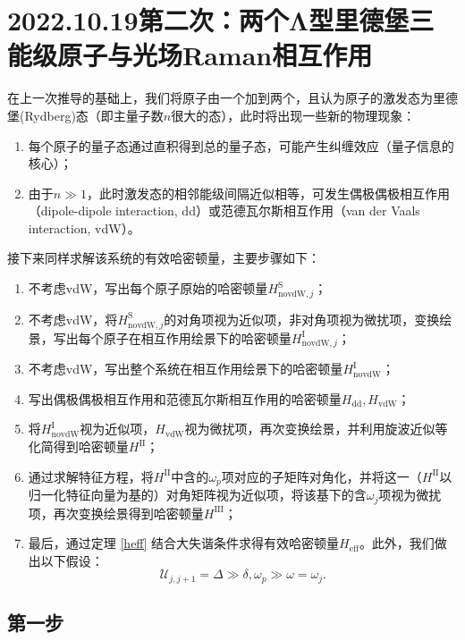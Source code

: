 \documentclass[
fontsetup = font-setup-open.tex,
titlesetup = titles-setup.tex
]{AJbook}
\numberwithin{equation}{section}
\begin{document}
\section[2022.10.19第二次]{2022.10.19第二次：两个Λ型里德堡三能级原子与光场Raman相互作用}
在上一次推导的基础上，我们将原子由一个加到两个，且认为原子的激发态为里德堡(Rydberg)态（即主量子数$ n $很大的态），此时将出现一些新的物理现象：
\begin{enumerate}
\item 每个原子的量子态通过直积得到总的量子态，可能产生纠缠效应（量子信息的核心）；
\item 由于$ n\gg 1 $，此时激发态的相邻能级间隔近似相等，可发生偶极偶极相互作用（dipole-dipole interaction, dd）或范德瓦尔斯相互作用（van der Vaals interaction, vdW）。
\end{enumerate}
接下来同样求解该系统的有效哈密顿量，主要步骤如下：
\begin{enumerate}
\item 不考虑vdW，写出每个原子原始的哈密顿量$ H_{\mathrm{novdW},j}^\mathrm{S} $；
\item 不考虑vdW，将$ H_{\mathrm{novdW},j}^\mathrm{S} $的对角项视为近似项，非对角项视为微扰项，变换绘景，写出每个原子在相互作用绘景下的哈密顿量$ H_{\mathrm{novdW},j}^\mathrm{I} $；
\item 不考虑vdW，写出整个系统在相互作用绘景下的哈密顿量$ H_{\mathrm{novdW}}^\mathrm{I} $；
\item 写出偶极偶极相互作用和范德瓦尔斯相互作用的哈密顿量$ H_{\mathrm{dd}},H_{\mathrm{vdW}} $；
\item 将$ H_{\mathrm{novdW}}^\mathrm{I} $视为近似项，$ H_{\mathrm{vdW}} $视为微扰项，再次变换绘景，并利用旋波近似等化简得到哈密顿量$ H^{\mathrm{II}} $；
\item 通过求解特征方程，将$ H^{\mathrm{II}} $中含的$ \omega_p $项对应的子矩阵对角化，并将这一（$ H^{\mathrm{II}} $以归一化特征向量为基的）对角矩阵视为近似项，将该基下的含$ \omega_j $项视为微扰项，再次变换绘景得到哈密顿量$ H^{\mathrm{III}} $；
\item 最后，通过定理 \ref{heff} 结合大失谐条件求得有效哈密顿量$ H_{\mathrm{eff}} $。此外，我们做出以下假设：
\begin{equation}\label{key}
\mathcal{U}_{j,j+1}=\Delta\gg\delta,\omega_p\gg\omega=\omega_j.
\end{equation}
\end{enumerate}
\subsection{第一步}
\end{document}
